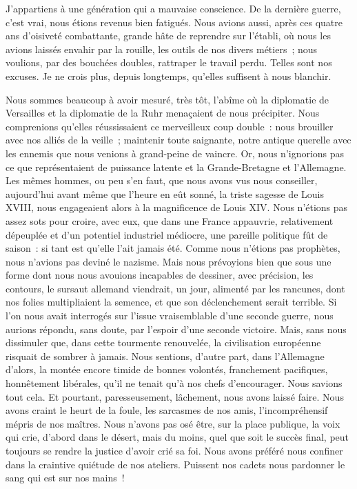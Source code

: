 \documentclass[french,twoside]{book} %
\begin{document}
\noindent J’appartiens à une génération qui a mauvaise conscience. De la dernière guerre, c’est vrai, nous étions revenus bien fatigués. Nous avions aussi, après ces quatre ans d’oisiveté combattante, grande hâte de reprendre sur l’établi, où nous les avions laissés envahir par la rouille, les outils de nos divers métiers ; nous voulions, par des bouchées doubles, rattraper le travail perdu. Telles sont nos excuses. Je ne crois plus, depuis longtemps, qu’elles suffisent à nous blanchir.\par
Nous sommes beaucoup à avoir mesuré, très tôt, l’abîme où la diplomatie de Versailles et la diplomatie de la Ruhr menaçaient de nous précipiter. Nous comprenions qu’elles réussissaient ce merveilleux coup double : nous brouiller avec nos alliés de la veille ; maintenir toute saignante, notre antique querelle avec les ennemis que nous venions à grand-peine de vaincre. Or, nous n’ignorions pas ce que représentaient de puissance latente et la Grande-Bretagne et l’Allemagne. Les mêmes hommes, ou peu s’en faut, que nous avons vus nous conseiller, aujourd’hui avant même que l’heure en eût sonné, la triste sagesse de Louis XVIII, nous engageaient alors à la magnificence de Louis XIV. Nous n’étions pas assez sots pour croire, avec eux, que dans une France appauvrie, relativement dépeuplée et d’un potentiel industriel médiocre, une pareille politique fût de saison : si tant est qu’elle l’ait jamais été. Comme nous n’étions pas prophètes, nous n’avions pas deviné le nazisme. Mais nous prévoyions bien que sous une forme dont nous nous avouions incapables de dessiner, avec précision, les contours, le sursaut allemand viendrait, un jour, alimenté par les   rancunes, dont nos folies multipliaient la semence, et que son déclenchement serait terrible. Si l’on nous avait interrogés sur l’issue vraisemblable d’une seconde guerre, nous aurions répondu, sans doute, par l’espoir d’une seconde victoire. Mais, sans nous dissimuler que, dans cette tourmente renouvelée, la civilisation européenne risquait de sombrer à jamais. Nous sentions, d’autre part, dans l’Allemagne d’alors, la montée encore timide de bonnes volontés, franchement pacifiques, honnêtement libérales, qu’il ne tenait qu’à nos chefs d’encourager. Nous savions tout cela. Et pourtant, paresseusement, lâchement, nous avons laissé faire. Nous avons craint le heurt de la foule, les sarcasmes de nos amis, l’incompréhensif mépris de nos maîtres. Nous n’avons pas osé être, sur la place publique, la voix qui crie, d’abord dans le désert, mais du moins, quel que soit le succès final, peut toujours se rendre la justice d’avoir crié sa foi. Nous avons préféré nous confiner dans la craintive quiétude de nos ateliers. Puissent nos cadets nous pardonner le sang qui est sur nos mains !\par
\end{document}
